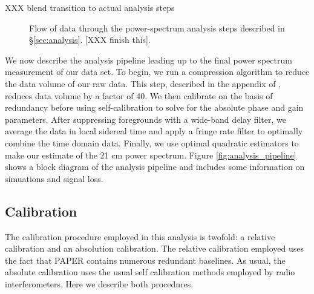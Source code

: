 \documentclass[twocolumn,numberedappendix]{emulateapj} \shorttitle{PSA64}
\begin{document}
XXX blend transition to actual analysis steps


\begin{figure}
\caption{
Flow of data through the power-spectrum analysis steps described in \S\ref{sec:analysis}.
[XXX finish this].
}
\label{fig:flowchart}
\end{figure}

We now describe the analysis pipeline leading up to the final power spectrum
measurement of our data set. To begin, we run a compression algorithm to reduce
the data volume of our raw data. This step, described in the appendix of
\cite{parsons_et_al2014}, reduces data volume by a factor of 40. We then
calibrate on the basis of redundancy before using self-calibration
to solve for the absolute phase and gain parameters. After suppressing
foregrounds with a wide-band delay filter, we average the data in local
sidereal time and apply a fringe rate filter to optimally combine the
time domain data. Finally, we use optimal quadratic estimators to make our
estimate of the 21 cm power spectrum.  Figure \ref{fig:analysis_pipeline} shows
a block diagram of the analysis pipeline and includes some information on
simuations and signal loss.

\subsection{Calibration}\label{sec:calibration}
The calibration procedure employed in this analysis is twofold: a relative
calibration and an absolution calibration. The relative calibration employed
uses the fact that PAPER contains numerous redundant baselines. As usual, the
absolute calibration uses the usual self calibration methods employed by radio
interferometers. Here we describe both procedures.
\end{document}
